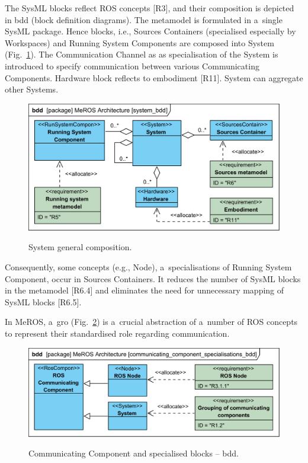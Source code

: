 \documentclass[11pt,oneside,a4paper]{report}
\begin{document}
	
	The SysML blocks reflect ROS concepts [R3], and their composition is depicted in bdd (block definition diagrams). The metamodel is formulated in a~single SysML package. Hence blocks, i.e., Sources Containers (specialised especially by Workspaces) and Running System Components are composed into System (Fig.~\ref{fig:ros_system_bdd}). The Communication Channel as as specialisation of the System is introduced to specify communication between various Communicating Components. Hardware block reflects to embodiment [R11]. System can aggregate other Systems.
	
		
	\begin{figure}[H]
		\centering
		\begin{center}
			{\includegraphics[scale=1.0]{diagrams/system_bdd.png}}
		\end{center}
		\caption{System general composition.} 
		\label{fig:ros_system_bdd}
	\end{figure}
	
	Consequently, some concepts (e.g., Node), a~specialisations of Running System Component, occur in Sources Containers. It reduces the number of SysML blocks in the metamodel [R6.4] and eliminates the need for unnecessary mapping of SysML blocks [R6.5].
		
	\pagebreak	
		
	In MeROS, a~gro (Fig.~\ref{fig:communicating_components_bdd}) is a~crucial abstraction of a~number of ROS concepts to represent their standardised role regarding communication. 
	
		
	\begin{figure}[H]
		\centering
		\begin{center}
			{\includegraphics[scale=1.0]{diagrams/communicating_component_specialisations_bdd.png}}
		\end{center}
		\caption{Communicating Component and specialised blocks -- bdd.} 
		\label{fig:communicating_components_bdd}
	\end{figure}
	
\end{document}
